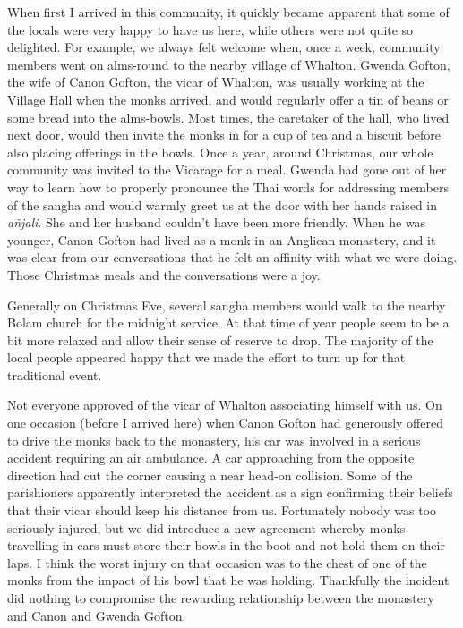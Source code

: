 When first I arrived in this community, it quickly became apparent that
some of the locals were very happy to have us here, while others were
not quite so delighted. For example, we always felt welcome when, once a
week, community members went on alms-round to the nearby village of
Whalton. Gwenda Gofton, the wife of Canon Gofton, the vicar of Whalton,
was usually working at the Village Hall when the monks arrived, and
would regularly offer a tin of beans or some bread into the alms-bowls.
Most times, the caretaker of the hall, who lived next door, would then
invite the monks in for a cup of tea and a biscuit before also placing
offerings in the bowls. Once a year, around Christmas, our whole
community was invited to the Vicarage for a meal. Gwenda had gone out of
her way to learn how to properly pronounce the Thai words for addressing
members of the sangha and would warmly greet us at the door with her
hands raised in \emph{añjali}. She and her husband couldn't have been
more friendly. When he was younger, Canon Gofton had lived as a monk in
an Anglican monastery, and it was clear from our conversations that he
felt an affinity with what we were doing. Those Christmas meals and the
conversations were a joy.

Generally on Christmas Eve, several sangha members would walk to the
nearby Bolam church\cite{bolam} for the midnight service.
At that time of year people
seem to be a bit more relaxed and allow their sense of reserve to drop.
The majority of the local people appeared happy that we made the effort
to turn up for that traditional event.

Not everyone approved of the vicar of Whalton associating himself with
us. On one occasion (before I arrived here) when Canon Gofton had
generously offered to drive the monks back to the monastery, his car was
involved in a serious accident requiring an air ambulance. A car
approaching from the opposite direction had cut the corner causing a
near head-on collision. Some of the parishioners apparently interpreted
the accident as a sign confirming their beliefs that their vicar should
keep his distance from us. Fortunately nobody was too seriously injured,
but we did introduce a new agreement whereby monks travelling in cars
must store their bowls in the boot and not hold them on their laps. I
think the worst injury on that occasion was to the chest of one of the
monks from the impact of his bowl that he was holding. Thankfully the
incident did nothing to compromise the rewarding relationship between
the monastery and Canon and Gwenda Gofton.

